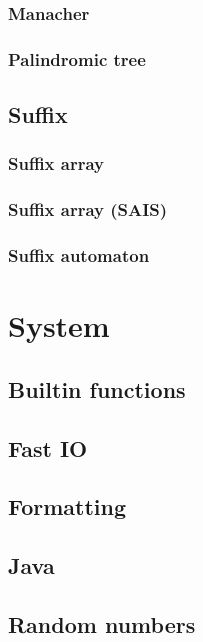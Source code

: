 \documentclass[titlepage,a4paper,10pt]{article}
\begin{document}
\begin{multicols}{2}
\begin{spacing}{0.8}
{				\subsubsection{Manacher}
					
				\subsubsection{Palindromic tree}
					
			\subsection{Suffix}
				\subsubsection{Suffix array}
					
				\subsubsection{Suffix array (SAIS)}
					
				\subsubsection{Suffix automaton}
					
		\section{System}
			\subsection{Builtin functions}
				
			\subsection{Fast IO}
				
			\subsection{Formatting}
				
			\subsection{Java}
				
			\subsection{Random numbers}
				
}
\end{spacing}
\end{multicols}
\end{document}
